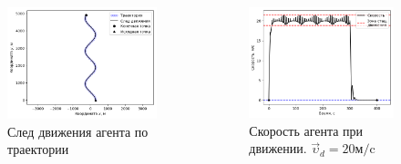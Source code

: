 \documentclass[10pt]{beamer}
\begin{document}
\begin{frame}
	\begin{columns}
	\begin{figure}
		\centering
		\includegraphics[width=0.8\linewidth]{master-trajectory-0}
		\caption{След движения агента по траектории}
		\label{fig:master-trajectory-0}
	\end{figure}
	\begin{figure}
		\centering
		\includegraphics[width=0.8\linewidth]{master-trajectory-0-velocity}
		\caption{Скорость агента при движении. $\vec{\upsilon}_{d} = 20 \text{м/c}$}
		\label{fig:master-trajectory-0-velocity}
	\end{figure}
\end{columns}
\end{frame}
\end{document}
